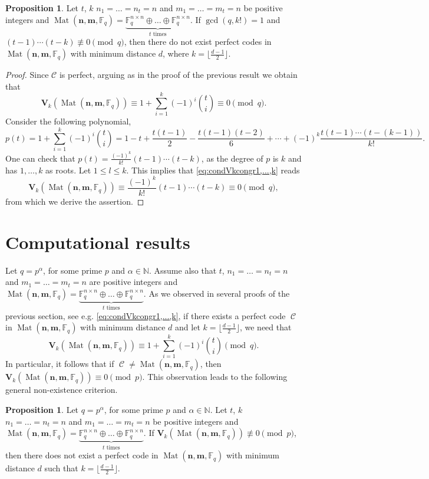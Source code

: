\documentclass[11pt]{amsart}
\DeclareMathOperator{\C}{\mathcal{C}}
\DeclareMathOperator{\Mat}{Mat}
\theoremstyle{definition}
\newtheorem{proposition}[theorem]{Proposition}
\newcommand{\F}{{\mathbb F}}
\newcommand{\NN}{{\mathbb N}}
\newcommand{\bfn}{\mathbf {n}}
\newcommand{\bfm}{\mathbf {m}}
\newcommand{\spacmn}{\Mat(\bfn,\bfm,\F_q)}
\begin{document}
\begin{proposition}\label{prop:divisvcond2}
Let $t$, $k$ $ n_1 = \ldots = n_t = n $ and $ m_1 = \ldots = m_t = n $ be positive integers and $\spacmn=\underbrace{\mathbb{F}_q^{n\times n}\oplus \ldots \oplus \F_q^{n\times n}}_{t \text{ times}}$.
If $\gcd(q,k!)=1$ and $(t-1)\cdots(t-k)\not\equiv 0\pmod q$, then there do not exist perfect codes in $\spacmn$ with minimum distance $d$, where $k=\lfloor\frac{d-1}{2}\rfloor$.
\end{proposition}
\begin{proof}
Since $\mathcal{C}$ is perfect, arguing as in the proof of the previous result we obtain that
\begin{equation}\label{eq:condVkcongr1,...,k}
\mathbf{V}_k(\spacmn)\equiv 1+\sum_{i=1}^{k}(-1)^i\binom{t}{i}\equiv0\pmod{q}.
\end{equation}
Consider the following polynomial, 
\[
p(t)=1+\sum_{i=1}^{k}(-1)^i\binom{t}{i}=1-t+\frac{t(t-1)}{2}-\frac{t(t-1)(t-2)}{6}+\cdots+(-1)^k\frac{t(t-1)\cdots(t-(k-1))}{k!}.
\]
One can check that $p(t)=\frac{(-1)^k}{k!}(t-1)\cdots(t-k)
$, as the degree of $p$ is $k$ and has $1,\ldots,k$ as roots. Let $1\leq l\leq k$. This implies that \eqref{eq:condVkcongr1,...,k} reads
\[
\mathbf{V}_k(\spacmn)\equiv \frac{(-1)^k}{k!}(t-1)\cdots(t-k)\equiv0\pmod{q},
\]
from which we derive the assertion.
\end{proof}


\section{Computational results}\label{sec:comput}

Let $q=p^\alpha$, for some prime $p$ and $\alpha \in \NN$.
Assume also that $t$, $ n_1 = \ldots = n_t = n $ and $ m_1 = \ldots = m_t = n $ are positive integers and $\spacmn=\underbrace{\mathbb{F}_q^{n\times n}\oplus \ldots \oplus \F_q^{n\times n}}_{t \text{ times}}$.
As we observed in several proofs of the previous section, see e.g. \eqref{eq:condVkcongr1,...,k}, if there exists a perfect code $\C$ in $\spacmn$ with minimum distance $d$ and let $k=\lfloor \frac{d-1}2\rfloor$, we need that
\[
\mathbf{V}_k(\spacmn)\equiv1+\sum_{i=1}^{k}(-1)^i\binom{t}{i}\pmod{q}.
\]
In particular, it follows that if $\C\ne \spacmn$, then $\mathbf{V}_k(\spacmn)\equiv 0 \pmod p$.
This observation leads to the following general non-existence criterion.

\begin{proposition}
    Let $q=p^\alpha$, for some prime $p$ and $\alpha \in \NN$.
    Let $t$, $k$ $ n_1 = \ldots = n_t = n $ and $ m_1 = \ldots = m_t = n $ be positive integers and $\spacmn=\underbrace{\mathbb{F}_q^{n\times n}\oplus \ldots \oplus \F_q^{n\times n}}_{t \text{ times}}$.
    If $\mathbf{V}_k(\spacmn)\not\equiv 0 \pmod{p}$, then there does not exist a perfect code in $\spacmn$ with minimum distance $d$ such that $k=\lfloor \frac{d-1}2\rfloor$.
\end{proposition}
\end{document}
